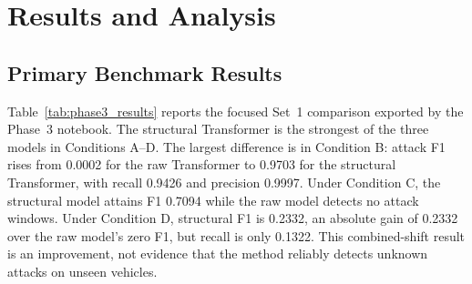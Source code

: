 \documentclass[12pt, a4paper, reqno, oneside]{book}
\begin{document}
\chapter{Results and Analysis}
\label{chap:experiments}

\section{Primary Benchmark Results}
\label{sec:primary_results}
Table~\ref{tab:phase3_results} reports the focused Set~1 comparison exported by the Phase~3 notebook. The structural Transformer is the strongest of the three models in Conditions A--D. The largest difference is in Condition B: attack F1 rises from 0.0002 for the raw Transformer to 0.9703 for the structural Transformer, with recall 0.9426 and precision 0.9997. Under Condition C, the structural model attains F1 0.7094 while the raw model detects no attack windows. Under Condition D, structural F1 is 0.2332, an absolute gain of 0.2332 over the raw model's zero F1, but recall is only 0.1322. This combined-shift result is an improvement, not evidence that the method reliably detects unknown attacks on unseen vehicles.

\begin{table}[htbp]
\centering
\caption{Focused Set~1 results by zero-shot condition}
\label{tab:phase3_results}
\small
\renewcommand{\arraystretch}{1.15}
%
\end{table}
\end{document}
